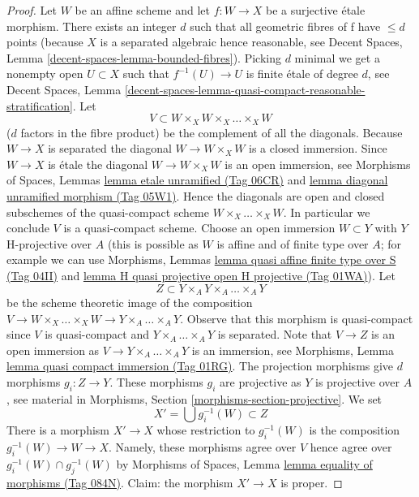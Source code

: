 \documentclass{amsart}
\theoremstyle{plain}
\theoremstyle{definition}
\theoremstyle{remark}
\numberwithin{equation}{subsection}
\begin{document}
\begin{proof}
Let $W$ be an affine scheme and let $f : W \to X$ be a surjective
\'etale morphism. There exists an integer $d$ such that all geometric
fibres of f have $\leq d$ points (because $X$ is a separated algebraic
hence reasonable, see
Decent Spaces, Lemma \ref{decent-spaces-lemma-bounded-fibres}).
Picking $d$ minimal we get a nonempty open $U \subset X$ such that
$f^{-1}(U) \to U$ is finite \'etale of degree $d$, see
Decent Spaces, Lemma
\ref{decent-spaces-lemma-quasi-compact-reasonable-stratification}.
Let
$$
V \subset W \times_X W \times_X \ldots \times_X W
$$
($d$ factors in the fibre product) be the complement of all the diagonals.
Because $W \to X$ is separated the diagonal $W \to W \times_X W$ is a
closed immersion. Since $W \to X$ is \'etale the diagonal
$W \to W \times_X W$ is an open immersion, see
Morphisms of Spaces, Lemmas
\href{https://stacks.math.columbia.edu/tag/06CR}{lemma etale unramified (Tag 06CR)} and
\href{https://stacks.math.columbia.edu/tag/05W1}{lemma diagonal unramified morphism (Tag 05W1)}.
Hence the diagonals are open and closed subschemes
of the quasi-compact scheme $W \times_X \ldots \times_X W$.
In particular we conclude $V$ is a quasi-compact scheme.
Choose an open immersion $W \subset Y$ with $Y$ H-projective over
$A$ (this is possible as $W$ is affine and of finite type over $A$;
for example we can use
Morphisms, Lemmas
\href{https://stacks.math.columbia.edu/tag/04II}{lemma quasi affine finite type over S (Tag 04II)} and
\href{https://stacks.math.columbia.edu/tag/01WA}{lemma H quasi projective open H projective (Tag 01WA)}).
Let
$$
Z \subset Y \times_A Y \times_A \ldots \times_A Y
$$
be the scheme theoretic image of the composition
$V \to W \times_X \ldots \times_X W \to Y \times_A \ldots \times_A Y$.
Observe that this morphism is quasi-compact since $V$ is quasi-compact
and $Y \times_A \ldots \times_A Y$ is separated.
Note that $V \to Z$ is an open immersion as
$V \to Y \times_A \ldots \times_A Y$ is an immersion, see
Morphisms, Lemma \href{https://stacks.math.columbia.edu/tag/01RG}{lemma quasi compact immersion (Tag 01RG)}.
The projection morphisms give $d$ morphisms $g_i : Z \to Y$.
These morphisms $g_i$ are projective as $Y$ is projective over $A$, see
material in Morphisms, Section \ref{morphisms-section-projective}.
We set
$$
X' = \bigcup g_i^{-1}(W) \subset Z
$$
There is a morphism $X' \to X$ whose restriction to $g_i^{-1}(W)$ is
the composition $g_i^{-1}(W) \to W \to X$.
Namely, these morphisms agree over $V$ hence agree over
$g_i^{-1}(W) \cap g_j^{-1}(W)$ by
Morphisms of Spaces, Lemma \href{https://stacks.math.columbia.edu/tag/084N}{lemma equality of morphisms (Tag 084N)}.
Claim: the morphism $X' \to X$ is proper.


\end{proof}
\end{document}
